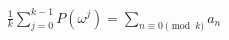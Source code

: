 \documentclass[preview]{standalone}
\begin{document}
\begin{align*}
\frac{1}{k} \sum_{j=0}^{k-1} P(\omega^j) = \sum_{n \equiv 0 \pmod k} a_n
\end{align*}
\end{document}
